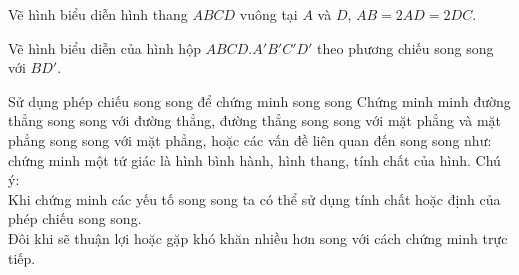 	\begin{bt}%
		Vẽ hình biểu diễn hình thang $ABCD$ vuông tại $A$ và $D$, $AB=2AD=2DC$.
	\end{bt}
	\begin{bt}%
		Vẽ hình biểu diễn của hình hộp $ABCD.A'B'C'D'$ theo phương chiếu song song với $BD'$.
	\end{bt}
	\begin{dang}{Sử dụng phép chiếu song song để chứng minh song song}
		Chứng minh minh đường thẳng song song với đường thẳng, đường thẳng song song với mặt phẳng và mặt phẳng song song với mặt phẳng, hoặc các vấn đề liên quan đến song song như: chứng minh một tứ giác là hình bình hành, hình thang, tính chất của hình.
		Chú ý:\\
		Khi chứng minh các yếu tố song song ta có thể sử dụng tính chất hoặc định của phép  chiếu song song.\\
		Đôi khi sẽ thuận lợi hoặc gặp khó khăn nhiều hơn song với cách chứng minh trực tiếp.
	\end{dang}
